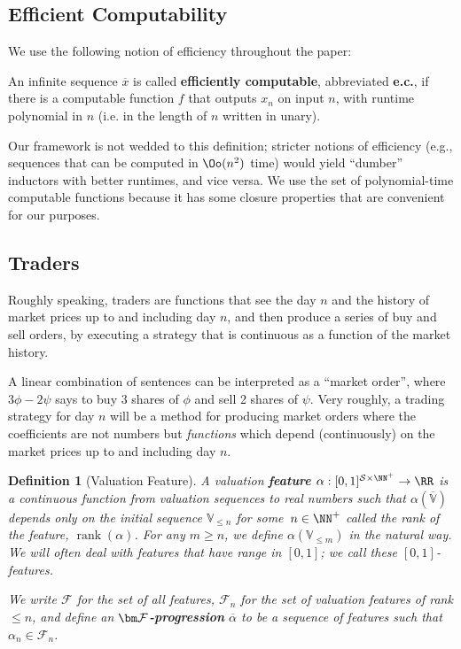 \documentclass[authordate,onecolumn,noenvironments]{miri-tech-article}
\newtheorem{definition}[theorem]{Definition}
\numberwithin{equation}{subsection}
\newcommand{\seq}[1]{{\overline{#1}}}
\newcommand{\rank}{\operatorname{rank}}
\newcommand{\mm}{m}
\newcommand{\nn}{n}
\newcommand{\ec}[1][\ ]{e.c.#1}
\newcommand{\feature}{\alpha} %
\newcommand{\features}{\mathcal{F}} %
\newcommand{\Valuation}{\mathbb{V}}
\newcommand{\Sentences}{\mathcal{S}}
\begin{document}
\subsection{Efficient Computability}\label{sec:efc}

We use the following notion of efficiency throughout the paper:

\begin{keydef}\label{def:ec}
  An infinite sequence $\seq{x}$ is called \textbf{efficiently computable}, abbreviated \textbf{\ec[]}, if there is a computable function $f$ that outputs $x_\nn$ on input $\nn$, with runtime polynomial in $\nn$ (i.e. in the length of $n$ written in unary).
\end{keydef}

\noindent Our framework is not wedded to this definition; stricter notions of efficiency (e.g., sequences that can be computed in $\Oo(n^2)$ time) would yield ``dumber'' inductors with better runtimes, and vice versa. We use the set of polynomial-time computable functions because it has some closure properties that are convenient for our purposes.


\subsection{Traders}\label{sec:traders}

Roughly speaking, traders are functions that see the day $\nn$ and the history of market prices up to and including day $\nn$, and then produce a series of buy and sell orders, by executing a strategy that is continuous as a function of the market history.

A linear combination of sentences can be interpreted as a ``market order'', where $3\phi - 2\psi$ says to buy 3 shares of $\phi$ and sell 2 shares of $\psi$. Very roughly, a trading strategy for day $\nn$ will be a method for producing market orders where the coefficients are not numbers but \emph{functions} which depend (continuously) on the market prices up to and including day $\nn$.

\begin{definition}[Valuation Feature]\label{def:valfeature}
A valuation \textbf{feature} $\feature : [0, 1]^{\Sentences \times \NN^+} \to \RR$ is a continuous function from valuation sequences to real numbers such that $\feature(\seq\Valuation)$ depends only on the initial sequence $\Valuation_{\le \nn}$ for some~$\nn\in\NN^+$ called the \emph{rank} of the feature, $\rank(\feature)$.  For any $\mm\geq\nn$, we define $\feature(\Valuation_{\leq m})$ in the natural way.   We will often deal with features that have range in $[0, 1]$; we call these $[0,1]$-features.

We write $\features$ for the set of all features, $\features_\nn$ for the set of valuation features of rank $\le\nn$, and define an
\textbf{$\bm\features$-progression} $\seq\feature$ to be a sequence of features such that $\feature_\nn \in \features_\nn$.
\end{definition}
\end{document}
